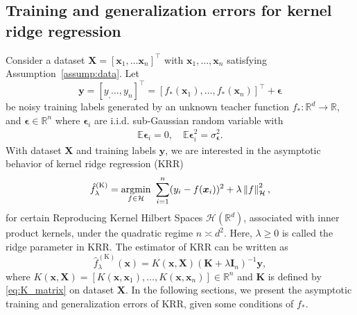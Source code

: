 \documentclass[twoside,11pt]{article}
\newcommand{\norm}[1]{\left\|#1\right\|}
\newcommand{\by}{\boldsymbol{y}}
\newcommand{\bepsilon}{\boldsymbol{\epsilon}}
\newcommand{\R}{\mathbb{R}}
\newcommand{\E}{\mathbb{E}}
\def\bI{{\mathbf I}}
\def\bK{{\boldsymbol K}}
\def\bX{{\boldsymbol X}}
\def\bx{{\boldsymbol x}}
\def\by{{\boldsymbol y}}
\def\K{{\mathbb K}}
\def\K{{\mathbb K}}
\renewcommand{\bK}{\boldsymbol{K}}
\renewcommand{\K}{\text{K}}
\newcommand{\1}{\mathbf{1}}
\def\mc#1{\mathcal{#1}}
\def\mc{\mathcal}
\def\Real{\mathbb{R}}
\def\Hilbert{\mc H}
\begin{document}
\subsection{Training and generalization errors for kernel ridge regression}
Consider a  dataset $\bX=[\bx_1,\ldots\bx_n]^\top$ with $\bx_1,\dots,\bx_n$ satisfying Assumption~\ref{assump:data}. Let 
\begin{equation}\label{eq:training_labels}
    \by=[y_,\ldots,y_n]^\top=[f_*(\bx_1),\ldots,f_*(\bx_n)]^\top+\bepsilon
\end{equation}
be noisy training labels generated by an unknown teacher function $f_*:\R^d\to\R$, and $\bepsilon\in\R^n$ where $\bepsilon_i$ are i.i.d. sub-Gaussian random variable with  \begin{align}\label{eq:def_sigma_eps}
  \E\bepsilon_i=0,  \quad \E\bepsilon_i^2=\sigma^2_{\bepsilon}.   
\end{align} 
With dataset $\bX$ and training labels $\by$, we are interested in the asymptotic behavior of kernel ridge regression (KRR) 
 $$\hat f^{(\K)}_\lambda = \underset{f\in\Hilbert}{\rm argmin}\ \sum_{i=1}^n (y_i - f(\bx_i))^2 + \lambda\norm{f}_\Hilbert^2,$$
for certain Reproducing Kernel Hilbert Spaces $\Hilbert(\Real^d)$, associated with inner product kernels, under the quadratic regime $n\asymp d^2.$ 
Here, $\lambda\ge 0$ is called the ridge parameter in KRR.
The estimator of KRR can be written as 
$$ \hat f^{(\K)}_\lambda(\bx)= K(\bx,\bX)(\bK+\lambda\bI_n)^{-1}\by,$$
where $K(\bx,\bX)=[K(\bx,\bx_1),\ldots,K(\bx,\bx_n)]\in\R^n$ and $\bK$ is defined by \eqref{eq:K_matrix} on dataset $\bX$. In the following sections, we present the asymptotic training and generalization errors of KRR, given some conditions of $f_*$.
\end{document}
